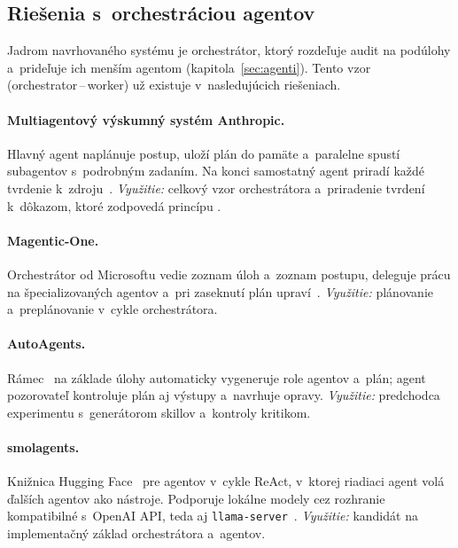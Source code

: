 \subsection{Riešenia s~orchestráciou agentov}
\label{sec:orchestracia-sota}

Jadrom navrhovaného systému je orchestrátor, ktorý rozdeľuje audit na
podúlohy a~prideľuje ich menším agentom (kapitola~\ref{sec:agenti}).
Tento vzor (orchestrator\,--\,worker) už existuje v~nasledujúcich
riešeniach.

\paragraph{Multiagentový výskumný systém Anthropic.} Hlavný agent
naplánuje postup, uloží plán do pamäte a~paralelne spustí subagentov
s~podrobným zadaním. Na konci samostatný agent priradí každé tvrdenie
k~zdroju~\cite{anthropic-multiagent}. \emph{Využitie:} celkový vzor
orchestrátora a~priradenie tvrdení k~dôkazom, ktoré zodpovedá princípu
.

\paragraph{Magentic-One.} Orchestrátor od Microsoftu vedie zoznam úloh
a~zoznam postupu, deleguje prácu na špecializovaných agentov a~pri
zaseknutí plán upraví~\cite{fourney2024magentic}. \emph{Využitie:}
plánovanie a~preplánovanie v~cykle orchestrátora.

\paragraph{AutoAgents.} Rámec~\cite{chen2024autoagents} na základe úlohy
automaticky vygeneruje role agentov a~plán; agent pozorovateľ kontroluje
plán aj výstupy a~navrhuje opravy. \emph{Využitie:} predchodca
experimentu s~generátorom skillov a~kontroly kritikom.

\paragraph{smolagents.} Knižnica Hugging Face~\cite{smolagents} pre agentov
v~cykle ReAct, v~ktorej riadiaci agent volá ďalších agentov ako nástroje.
Podporuje lokálne modely cez rozhranie kompatibilné s~OpenAI API, teda aj
\texttt{llama-server}~\cite{llamacpp}. \emph{Využitie:} kandidát na
implementačný základ orchestrátora a~agentov.

